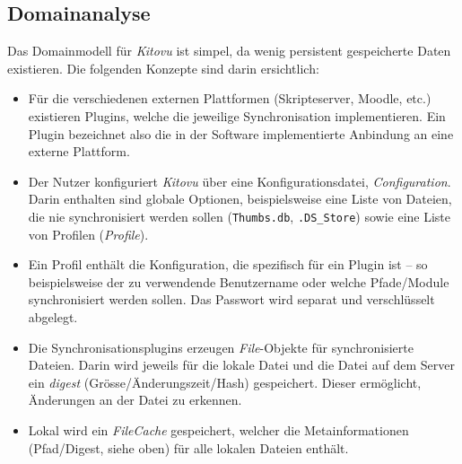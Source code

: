 \documentclass[a4paper]{article}
\let\oldsection\section
\renewcommand\section{\clearpage\oldsection}
\begin{document}
\pagebreak
\begin{landscape}
  \thispagestyle{empty}
  \section{Domainanalyse}
  Das Domainmodell für \emph{Kitovu} ist simpel, da wenig persistent
  gespeicherte Daten existieren. Die folgenden Konzepte sind darin ersichtlich:

  \begin{itemize}
  \item Für die verschiedenen externen Plattformen (Skripteserver, Moodle, etc.) existieren
    Plugins, welche die jeweilige Synchronisation implementieren. Ein Plugin bezeichnet also die in der Software implementierte Anbindung an eine externe Plattform.
  \item Der Nutzer konfiguriert \emph{Kitovu} über eine Konfigurationsdatei,
    \emph{Configuration}. Darin enthalten sind globale Optionen, beispielsweise eine Liste
    von Dateien, die nie synchronisiert werden sollen (\verb|Thumbs.db|, \verb|.DS_Store|) sowie eine Liste von Profilen
(\emph{Profile}).
  \item Ein Profil enthält die Konfiguration, die spezifisch für ein Plugin
    ist -- so beispielsweise der zu verwendende Benutzername oder welche Pfade/Module synchronisiert
    werden sollen. Das Passwort wird separat und verschlüsselt abgelegt.
  \item Die Synchronisationsplugins erzeugen \emph{File}-Objekte für
    synchronisierte Dateien. Darin wird jeweils für die lokale Datei
    und die Datei auf dem Server ein \emph{digest} (Grösse/Änderungszeit/Hash) gespeichert. Dieser ermöglicht, Änderungen an der Datei zu erkennen.
  \item Lokal wird ein \emph{FileCache} gespeichert, welcher die
    Metainformationen (Pfad/Digest, siehe oben) für alle lokalen Dateien
    enthält.
  \end{itemize}

  \vspace{0.3em}

\end{landscape}
\end{document}
